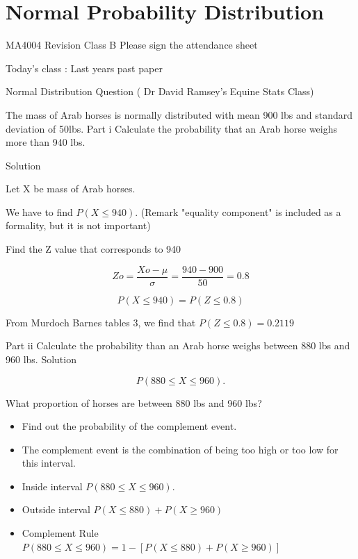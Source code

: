 \documentclass[12pt]{report}
\begin{document}
{%

\chapter{Normal Probability Distribution}
MA4004 Revision Class B
Please sign the attendance sheet

Today's class : Last years past paper 


Normal Distribution Question ( Dr David Ramsey's Equine Stats Class)

The mass of Arab horses is normally distributed with mean 900 lbs and standard deviation of 50lbs.
Part i Calculate the probability that an Arab horse weighs more than 940 lbs.


Solution

Let X be mass of Arab horses.

We have to find $P(X\leq940)$.            (Remark "equality component" is included as a formality, but it is not important)


Find the Z value that corresponds to 940 

\[Zo=\frac{Xo-\mu}{\sigma}= \frac{940 -900}{50}= 0.8\]

\[P(X \leq 940) = P(Z \leq 0.8) \]


From Murdoch Barnes tables 3, we find that $P(Z \leq 0.8) = 0.2119$



Part ii Calculate the probability than an Arab horse weighs between 880 lbs and 960 lbs.
Solution 

\[P ( 880 \leq X \leq 960).\]


What proportion of horses are between 880 lbs and 960 lbs?
\begin{itemize}
\item Find out the probability of the complement event.
\item The complement event is the combination of being too high  or too low for this interval.

\item Inside interval $P ( 880 \leq X \leq 960).$

\item Outside interval $P (X \leq 880) + P(X \geq 960)$

\item Complement Rule $P ( 880\leq X \leq 960)  = 1 - [P (X\leq 880) +P(X\geq 960)]$

\end{itemize}



}
\end{document}
